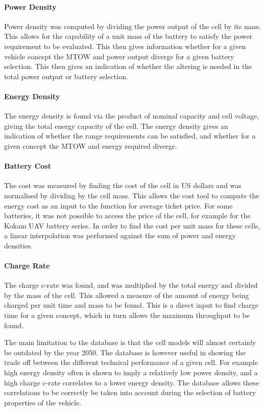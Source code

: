  \paragraph{Power Density} Power density was computed by dividing the power output of the cell by its mass. This allows for the capability of a unit mass of the battery to satisfy the power requirement to be evaluated. This then gives information whether for a given vehicle concept the MTOW and power output diverge for a given battery selection. This then gives an indication of whether the altering is needed in the total power output or battery selection. 
 \paragraph{Energy Density}  The energy density is found via the product of nominal capacity and cell voltage, giving the total energy capacity of the cell. The energy density gives an indication of whether the range requirements can be satisfied, and whether for a given concept the MTOW and energy required diverge.
 \paragraph{Battery Cost} The cost was measured by finding the cost of the cell in US dollars and was normalised by dividing by the cell mass. This allows the cost tool to compute the energy cost as an input to the function for average ticket price. For some batteries, it was not possible to access the price of the cell, for example for the Kokam UAV battery series. In order to find the cost per unit mass for these cells, a linear interpolation was performed against the sum of power and energy densities. 
 \paragraph{Charge Rate} The charge c-rate was found, and was multiplied by the total energy and divided by the mass of the cell. This allowed a measure of the amount of energy being charged per unit time and mass to be found. This is a direct input to find charge time for a given concept, which in turn allows the maximum throughput to be found.  

 The main limitation to the database is that the cell models will almost certainly be outdated by the year 2050. The database is however useful in showing the trade off between the different technical performance of a given cell. For example high energy density often is shown to imply a relatively low power density, and a high charge c-rate correlates to a lower energy density. The database allows these correlations to be correctly be taken into account during the selection of battery properties of the vehicle. 





 



 
